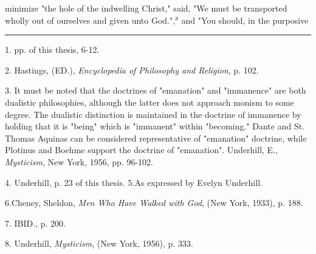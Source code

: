 minimize "the hole of the indwelling Christ," said, "We must be
transported wholly out of ourselves and given unto God.",$^{8}$
\hfill and \hfill"You should, in the purposive\linebreak
\null\par
\vspace*{-\baselineskip}
\vspace*{\fill}
\noindent\rule{0.25\textwidth}{0.4pt}\par
1. pp. of this thesis, 6-12.\par
2. Hastings, (ED.), \textit{Encyclopedia of Philosophy and Religion}, p. 102.\par
3. It must be noted that the doctrines of "emanation" and
"immanence" are both dualistic philosophies, although the
latter does not approach monism to some degree. The dualistic
distinction is maintained in the doctrine of immanence by
holding that it is "being" which is "immanent" within "becoming."
Dante and St. Thomas Aquinas can be considered representative
of "emanation" doctrine, while Plotinus and
Boehme support the doctrine of "emanation". Underhill, E., \textit{Mysticism}, New York, 1956, pp. 96-102.\par
4. Underhill, p. 23 of this thesis.
5.As expressed by Evelyn Underhill.\par
6.Cheney, Sheldon, \textit{Men Who Have Walked with God}, (New York,
1933), p. 188.\par
7. IBID., p. 200.\par
8. Underhill, \textit{Mysticism}, (New York, 1956), p. 333.\par

\newpage

